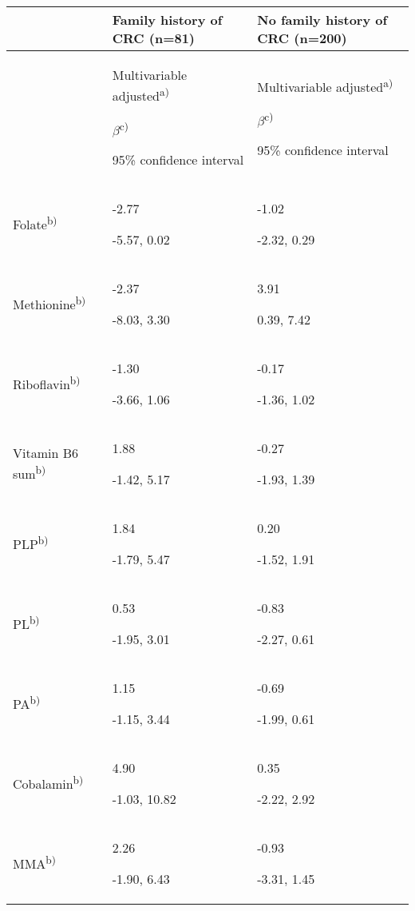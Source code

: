 \begin{flushleft}
\small
{}
\label{table5_3}
\tablehead{}
\begin{supertabular}{m{3cm}m{4.5cm}m{4.6cm}}
\hline
~
 &
\bfseries Family history of
CRC (n=81) &
\bfseries No
family history of CRC (n=200)\\\hline
~
 &
{ Multivariable
adjusted\textsuperscript{a)}}

{ $\beta $\textsuperscript{c)}}

 95\% confidence interval &
{ Multivariable
adjusted\textsuperscript{a)}}

{ $\beta $\textsuperscript{c)}}

 95\% confidence interval\\\hline
 Folate\textsuperscript{b)} &
{ {}-2.77}

 {}-5.57, 0.02 &
{ {}-1.02}

 {}-2.32, 0.29\\\hline
 Methionine\textsuperscript{b)} &
{ {}-2.37}

 {}-8.03, 3.30 &
{ 3.91}

 0.39, 7.42\\\hline
 Riboflavin\textsuperscript{b)} &
{ {}-1.30}

 {}-3.66, 1.06 &
{ {}-0.17}

 {}-1.36, 1.02\\\hline
 Vitamin B6 sum\textsuperscript{b)} &
{ 1.88}

 {}-1.42, 5.17 &
{ {}-0.27}

 {}-1.93, 1.39\\\hline
 PLP\textsuperscript{b)} &
{ 1.84}

 {}-1.79, 5.47 &
{ 0.20}

 {}-1.52, 1.91\\\hline
 PL\textsuperscript{b)} &
{ 0.53}

 {}-1.95, 3.01 &
{ {}-0.83}

 {}-2.27, 0.61\\\hline
 PA\textsuperscript{b)} &
{ 1.15}

 {}-1.15, 3.44 &
{ {}-0.69}

 {}-1.99, 0.61\\\hline
 Cobalamin\textsuperscript{b)} &
{ 4.90}

 {}-1.03, 10.82 &
{ 0.35}

 {}-2.22, 2.92\\\hline
 MMA\textsuperscript{b)} &
{ 2.26}

 {}-1.90, 6.43 &
{ {}-0.93}

 {}-3.31, 1.45\\\hline
\end{supertabular}
\end{flushleft}



